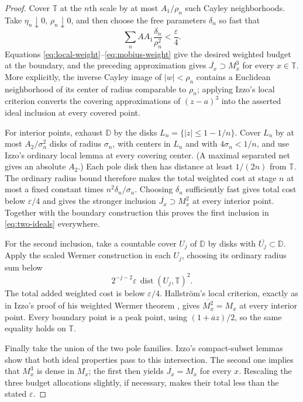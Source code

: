 \documentclass[11pt]{article}
\newcommand{\D}{\mathbb D}
\newcommand{\T}{\mathbb T}
\newcommand{\cl}[1]{\overline{#1}}
\begin{document}
\begin{proof}
Cover $\T$ at the $n$th scale by at most $A_1/\rho_n$ such Cayley
neighborhoods.  Take $\eta_n\downarrow0$, $\rho_n\downarrow0$, and then choose
the free parameters $\delta_n$ so fast that
\[
              \sum_n A A_1\frac{\delta_n}{\rho_n^2}
              <\frac{\varepsilon}{4}.
\]
Equations \eqref{eq:local-weight}--\eqref{eq:mobius-weight} give the desired
weighted budget at the boundary, and the preceding approximation gives
$\cl{J_x}\supset M_x^3$ for every $x\in\T$.  More explicitly, the inverse
Cayley image of $|w|<\rho_n$ contains a Euclidean neighborhood of its center
of radius comparable to $\rho_n$; applying Izzo's local criterion
\cite[Lemma 4.1]{Izzo} converts the covering approximations of
$(z-a)^3$ into the asserted ideal inclusion at every covered point.

For interior points, exhaust $\D$ by the disks
$L_n=\{|z|\leq1-1/n\}$.  Cover $L_n$ by at most
$A_2/\sigma_n^2$ disks of radius $\sigma_n$, with centers in $L_n$ and with
$4\sigma_n<1/n$, and use Izzo's ordinary local lemma at every covering center.
(A maximal separated net gives an absolute $A_2$.)  Each pole disk then has distance at least $1/(2n)$ from
$\T$.  The ordinary radius bound therefore makes the total weighted cost at
stage $n$ at most a fixed constant times $n^2\delta_n/\sigma_n$.  Choosing
$\delta_n$ sufficiently fast gives total cost below $\varepsilon/4$ and gives
the stronger inclusion $\cl{J_x}\supset M_x^2$ at every interior point.
Together with the boundary construction this proves the first inclusion in
\eqref{eq:two-ideals} everywhere.

For the second inclusion, take a countable cover $U_j$ of $\D$ by disks with
$\cl{U_j}\subset\D$.  Apply the scaled Wermer construction in each $U_j$,
choosing its ordinary radius sum below
\[
  2^{-j-2}\varepsilon\,\operatorname{dist}(U_j,\T)^2.
\]
The total added weighted cost is below $\varepsilon/4$.  Hallstr\"om's local
criterion, exactly as in Izzo's proof of his weighted Wermer theorem
\cite[Theorem 6.6]{Izzo}, gives $\cl{M_x^2}=M_x$ at every interior point.
Every boundary point is a peak point, using
$(1+\overline a z)/2$, so the same equality holds on $\T$.

Finally take the union of the two pole families.  Izzo's compact-subset
lemmas \cite[Lemmas 5.1 and 5.2]{Izzo} show that both ideal properties pass to
this intersection.  The second one implies that $M_x^3$ is dense in $M_x$;
the first then yields $\cl{J_x}=M_x$ for every $x$.  Rescaling the three budget
allocations slightly, if necessary, makes their total less than the stated
$\varepsilon$.
\end{proof}
\end{document}
